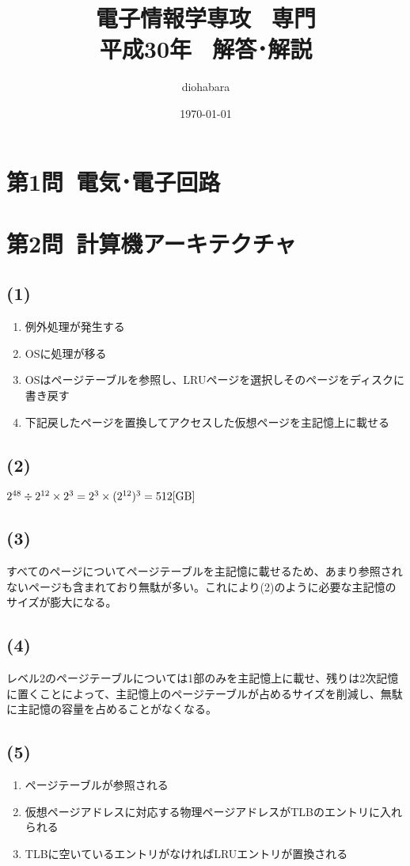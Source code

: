 \documentclass[a4paper,12pt,xelatex,ja=standard]{bxjsarticle}
\title{電子情報学専攻 \, 専門 \\ 平成30年 \, 解答･解説}
\author{diohabara}
\date{\today}
\begin{document}
\maketitle

\section*{第1問\ 電気･電子回路}

\section*{第2問\ 計算機アーキテクチャ}
\subsection*{(1)}
\begin{enumerate}
  \item 例外処理が発生する
  \item OSに処理が移る
  \item OSはページテーブルを参照し、LRUページを選択しそのページをディスクに書き戻す
  \item 下記戻したページを置換してアクセスした仮想ページを主記憶上に載せる
\end{enumerate}

\subsection*{(2)}
$2^{48} \divisionsymbol 2^{12} \times 2^3 = 2^3 \times (2^{12})^3 = 512\text{[GB]}$

\subsection*{(3)}
すべてのページについてページテーブルを主記憶に載せるため、あまり参照されないページも含まれており無駄が多い。これにより(2)のように必要な主記憶のサイズが膨大になる。

\subsection*{(4)}
レベル2のページテーブルについては1部のみを主記憶上に載せ、残りは2次記憶に置くことによって、主記憶上のページテーブルが占めるサイズを削減し、無駄に主記憶の容量を占めることがなくなる。

\subsection*{(5)}
\begin{enumerate}
  \item ページテーブルが参照される
  \item 仮想ページアドレスに対応する物理ページアドレスがTLBのエントリに入れられる
  \item TLBに空いているエントリがなければLRUエントリが置換される
\end{enumerate}
\end{document}
